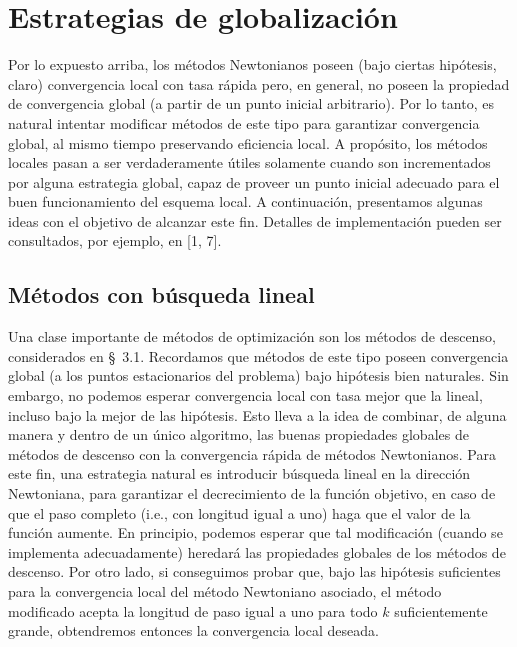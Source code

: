 
\section{Estrategias de globalización}\label{v2:sec:3.3}

Por lo expuesto arriba, los métodos Newtonianos poseen (bajo ciertas hipótesis, claro) convergencia local con tasa rápida pero, en general, no poseen la propiedad de convergencia global (a partir de un punto inicial arbitrario). Por lo tanto, es natural intentar modificar métodos de este tipo para garantizar convergencia global, al mismo tiempo preservando eficiencia local. A propósito, los métodos locales pasan a ser verdaderamente útiles solamente cuando son incrementados por alguna estrategia global, capaz de proveer un punto inicial adecuado para el buen funcionamiento del esquema local. A continuación, presentamos algunas ideas con el objetivo de alcanzar este fin. Detalles de implementación pueden ser consultados, por ejemplo, en [1, 7].

\subsection{Métodos con búsqueda lineal}\label{v2:sec:3.3.1}

Una clase importante de métodos de optimización son los métodos de descenso, considerados en \S~3.1. Recordamos que métodos de este tipo poseen convergencia global (a los puntos estacionarios del problema) bajo hipótesis bien naturales. Sin embargo, no podemos esperar convergencia local con tasa mejor que la lineal, incluso bajo la mejor de las hipótesis. Esto lleva a la idea de combinar, de alguna manera y dentro de un único algoritmo, las buenas propiedades globales de métodos de descenso con la convergencia rápida de métodos Newtonianos. Para este fin, una estrategia natural es introducir búsqueda lineal en la dirección Newtoniana, para garantizar el decrecimiento de la función objetivo, en caso de que el paso completo (i.e., con longitud igual a uno) haga que el valor de la función aumente. En principio, podemos esperar que tal modificación (cuando se implementa adecuadamente) heredará las propiedades globales de los métodos de descenso. Por otro lado, si conseguimos probar que, bajo las hipótesis suficientes para la convergencia local del método Newtoniano asociado, el método modificado acepta la longitud de paso igual a uno para todo $k$ suficientemente grande, obtendremos entonces la convergencia local deseada.

